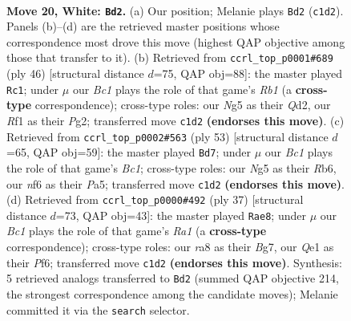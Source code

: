 \documentclass[11pt]{article}
\begin{document}
\begin{figure}[p]
\label{fig:thought-m36}
\end{figure}

\clearpage

\begin{figure}[p]\centering
\begin{subfigure}{0.46\textwidth}\centering
\resizebox{\linewidth}{!}{%
\newchessgame
\chessboard[
  setfen={r1b2rk1/5p2/5np1/2pqp1Np/p6P/2PP2P1/P4P2/R1B1QRK1 w - - 0 20},
  showmover=false,
  pgfstyle=straightmove, color=movearrow, markmove={c1-d2}
]}
\caption{}
\end{subfigure}\hfill
\begin{subfigure}{0.46\textwidth}\centering
\resizebox{\linewidth}{!}{%
\newchessgame
\chessboard[
  setfen={1r3rk1/3q3p/3p1np1/3Pp3/1p2Pp2/5P2/1P1QN1PP/RR5K w - - 0 24},
  showmover=false,
  pgfstyle=straightmove, color=movearrow, markmove={b1-c1}
]}
\caption{}
\end{subfigure}
\\[4pt]
\begin{subfigure}{0.46\textwidth}\centering
\resizebox{\linewidth}{!}{%
\newchessgame
\chessboard[
  setfen={2bq1rk1/5p2/pr1p2p1/p6p/4PPnP/2NQ2P1/BP1R4/1K5R b - - 3 27},
  showmover=false,
  pgfstyle=straightmove, color=movearrow, markmove={c8-d7}
]}
\caption{}
\end{subfigure}\hfill
\begin{subfigure}{0.46\textwidth}\centering
\resizebox{\linewidth}{!}{%
\newchessgame
\chessboard[
  setfen={r4rk1/p2q2bp/1p3pp1/n2p4/P2P1B2/2PQ1N1P/5PP1/R3R1K1 b - - 1 19},
  showmover=false,
  pgfstyle=straightmove, color=movearrow, markmove={a8-e8}
]}
\caption{}
\end{subfigure}
\caption{\textbf{Move 20, White: \texttt{Bd2}.} (a) Our position; Melanie plays \texttt{Bd2} (\texttt{c1d2}). Panels (b)--(d) are the retrieved master positions whose correspondence most drove this move (highest QAP objective among those that transfer to it). (b) Retrieved from \texttt{ccrl\_top\_p0001\#689} (ply 46) [structural distance $d$=75, QAP obj=88]: the master played \texttt{Rc1}; under $\mu$ our \emph{Bc1} plays the role of that game's \emph{Rb1} (a \textbf{cross-type} correspondence); cross-type roles: our \emph{N}g5 as their \emph{Q}d2, our \emph{R}f1 as their \emph{P}g2; transferred move \texttt{c1d2} \textbf{(endorses this move)}. (c) Retrieved from \texttt{ccrl\_top\_p0002\#563} (ply 53) [structural distance $d$=65, QAP obj=59]: the master played \texttt{Bd7}; under $\mu$ our \emph{Bc1} plays the role of that game's \emph{Bc1}; cross-type roles: our \emph{N}g5 as their \emph{R}b6, our \emph{n}f6 as their \emph{P}a5; transferred move \texttt{c1d2} \textbf{(endorses this move)}. (d) Retrieved from \texttt{ccrl\_top\_p0000\#492} (ply 37) [structural distance $d$=73, QAP obj=43]: the master played \texttt{Rae8}; under $\mu$ our \emph{Bc1} plays the role of that game's \emph{Ra1} (a \textbf{cross-type} correspondence); cross-type roles: our \emph{r}a8 as their \emph{B}g7, our \emph{Q}e1 as their \emph{P}f6; transferred move \texttt{c1d2} \textbf{(endorses this move)}. Synthesis: 5 retrieved analogs transferred to \texttt{Bd2} (summed QAP objective 214, the strongest correspondence among the candidate moves); Melanie committed it via the \texttt{search} selector.}

\end{figure}
\end{document}
